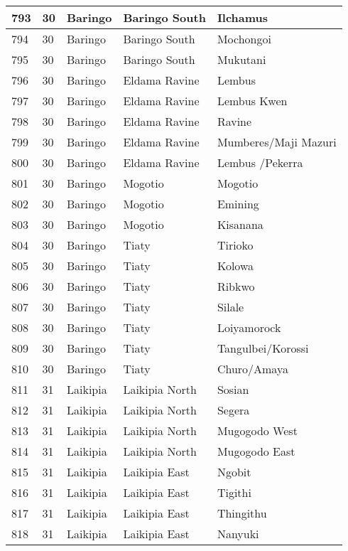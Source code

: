 \begin{table}[!ht]
\begin{tabular}{|l|l|l|l|l|}
        793 & 30 & Baringo & Baringo South & Ilchamus \\ \hline
        794 & 30 & Baringo & Baringo South & Mochongoi \\ \hline
        795 & 30 & Baringo & Baringo South & Mukutani \\ \hline
        796 & 30 & Baringo & Eldama Ravine & Lembus \\ \hline
        797 & 30 & Baringo & Eldama Ravine & Lembus Kwen \\ \hline
        798 & 30 & Baringo & Eldama Ravine & Ravine \\ \hline
        799 & 30 & Baringo & Eldama Ravine & Mumberes/Maji Mazuri \\ \hline
        800 & 30 & Baringo & Eldama Ravine & Lembus /Pekerra \\ \hline
        801 & 30 & Baringo & Mogotio & Mogotio \\ \hline
        802 & 30 & Baringo & Mogotio & Emining \\ \hline
        803 & 30 & Baringo & Mogotio & Kisanana \\ \hline
        804 & 30 & Baringo & Tiaty & Tirioko \\ \hline
        805 & 30 & Baringo & Tiaty & Kolowa \\ \hline
        806 & 30 & Baringo & Tiaty & Ribkwo \\ \hline
        807 & 30 & Baringo & Tiaty & Silale \\ \hline
        808 & 30 & Baringo & Tiaty & Loiyamorock \\ \hline
        809 & 30 & Baringo & Tiaty & Tangulbei/Korossi \\ \hline
        810 & 30 & Baringo & Tiaty & Churo/Amaya \\ \hline
        811 & 31 & Laikipia & Laikipia North & Sosian \\ \hline
        812 & 31 & Laikipia & Laikipia North & Segera \\ \hline
        813 & 31 & Laikipia & Laikipia North & Mugogodo West \\ \hline
        814 & 31 & Laikipia & Laikipia North & Mugogodo East \\ \hline
        815 & 31 & Laikipia & Laikipia East & Ngobit \\ \hline
        816 & 31 & Laikipia & Laikipia East & Tigithi \\ \hline
        817 & 31 & Laikipia & Laikipia East & Thingithu \\ \hline
        818 & 31 & Laikipia & Laikipia East & Nanyuki \\ \hline

\end{tabular}
\end{table}
